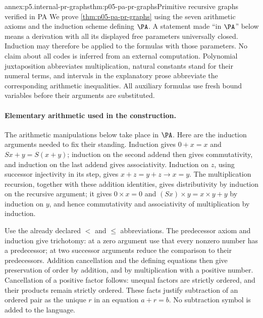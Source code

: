
\begin{annexitem}{annex:p5.internal-pr-graphs}{thm:p05-pa-pr-graphs}{Primitive recursive graphs verified in PA}
We prove \cref{thm:p05-pa-pr-graphs} using the seven arithmetic axioms and
the induction scheme defining \(\PA\).  A statement made ``in \(\PA\)''
below means a derivation with all its displayed free parameters universally
closed.  Induction may therefore be applied to the formulas with those
parameters.  No claim about all codes is inferred from an external computation.
Polynomial juxtaposition abbreviates multiplication, natural constants stand
for their numeral terms, and intervals in the explanatory prose abbreviate
the corresponding arithmetic inequalities.  All auxiliary formulas use
fresh bound variables before their arguments are substituted.

\paragraph{Elementary arithmetic used in the construction.}
The arithmetic manipulations below take place in \(\PA\).  Here are the
induction arguments needed to fix their standing.  Induction gives
\(0+x=x\) and \(Sx+y=S(x+y)\); induction on the second addend then gives
commutativity, and induction on the last addend gives associativity.
Induction on \(z\), using successor injectivity in its step, gives
\(x+z=y+z\to x=y\).  The multiplication recursion, together with these
addition identities, gives distributivity by induction on the recursive
argument; it gives \(0\times x=0\) and
\((Sx)\times y=x\times y+y\) by induction on \(y\), and hence
commutativity and associativity of multiplication by induction.

Use the already declared \(<\) and \(\leq\) abbreviations.  The predecessor
axiom and induction give trichotomy: at a zero argument use that every
nonzero number has a predecessor; at two successor arguments reduce the
comparison to their predecessors.  Addition cancellation and the defining
equations then give preservation of order by addition, and by multiplication
with a positive number.  Cancellation of a positive factor follows: unequal
factors are strictly ordered, and their products remain strictly ordered.
These facts justify subtraction of an ordered pair as the unique \(r\)
in an equation \(a+r=b\).  No subtraction symbol is added to the language.


\end{annexitem}
